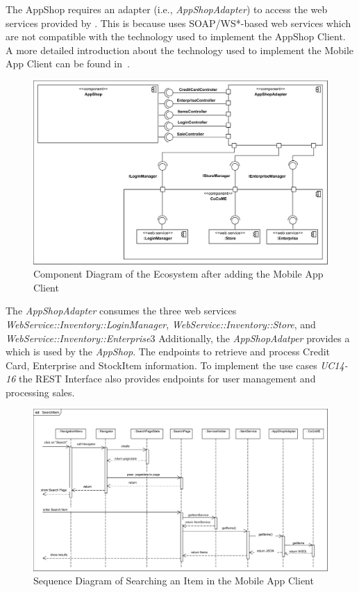 The AppShop requires an adapter (i.e., \textit{AppShopAdapter}) to access the web services provided by \CoCoME. %
This is because \CoCoME uses SOAP/WS*-based web services which are not compatible with the technology used to implement the AppShop Client. 
A more detailed introduction about the technology used to implement the Mobile App Client can be found in~\cite{schnabel}. 
  
 \begin{figure}[!h]
	\includegraphics[width=\textwidth]{img/appComponent.png}
	\caption{Component Diagram of the \CoCoME Ecosystem after adding the Mobile App Client}
	\label{ComponentApp}
\end{figure}

The \textit{AppShopAdapter} consumes the three web services \textit{WebService::Inventory::LoginManager}, \textit{WebService::Inventory::Store}, and \textit{WebService::Inventory::Enterprise}3
Additionally, the \textit{AppShopAdatper} provides a   which is used by the \textit{AppShop}. 
The   endpoints to retrieve and process Credit Card, Enterprise and StockItem information. 
To implement the use cases \emph{UC14-16} the REST Interface also provides endpoints for user management and processing sales. 
  
\begin{figure}[!h]
	\includegraphics[width=\textwidth]{img/appSearchSequence.png}
	\caption{Sequence Diagram of Searching an Item in the Mobile App Client}
	\label{SequenceAppSearch}
\end{figure}

